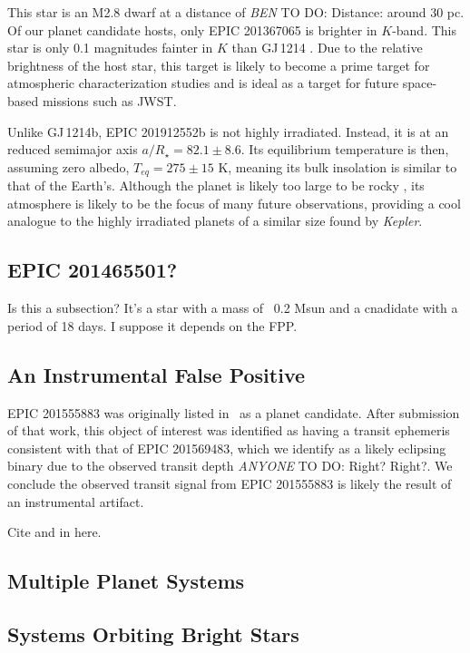 \documentclass{emulateapj}
\newcommand{\ars}{{$a/R_{\star}$}}
\newcommand{\project}[1]{\textsl{#1}}
\newcommand{\kep}{\project{Kepler}}
\newcommand{\paperit}{\citet{Foreman-Mackey15}}
\newcommand{\todo}[3]{{\color{#2} \emph{#1} TO DO: #3}}
\newcommand{\btmtodo}[1]{\todo{BEN}{red}{#1}}
\newcommand{\anytodo}[1]{\todo{ANYONE}{NavyBlue}{#1}}
\begin{document}
This star is an M2.8 dwarf at a distance of \btmtodo{Distance: around 30 pc}.
Of our planet candidate hosts, only EPIC 201367065 \citep[originally
discovered by][]{Crossfield15} is brighter in $K$-band.
This star is only 0.1 magnitudes fainter in $K$ than GJ\,1214 
\citep{Charbonneau09}.
Due to the relative brightness of the host star, this target is likely
to become a prime target for atmospheric characterization studies
and is ideal as a target for future space-based missions such as JWST.

Unlike GJ\,1214b, EPIC 201912552b is not highly irradiated. 
Instead, it is at an reduced semimajor axis \ars$ = 82.1 \pm 8.6$.
Its equilibrium temperature is then, assuming zero albedo, $T_{eq} = 275 \pm 15$
K, meaning its bulk insolation is similar to that of the Earth's.
Although the planet is likely too large to be rocky \citep{Rogers14}, 
its atmosphere is likely to be the focus of many future observations, providing
a cool analogue to the highly irradiated planets of a similar size found by 
\kep.



\subsection{EPIC 201465501?}
Is this a subsection? It's a star with a mass of ~0.2 Msun and a cnadidate with
a period of 18 days. I suppose it depends on the FPP.

\subsection{An Instrumental False Positive}

EPIC 201555883 was originally listed in \paperit\ as a planet candidate.
After submission of that work, this object of interest was identified as 
having a transit ephemeris consistent with that of EPIC 201569483, 
which we identify as a likely eclipsing binary due to the observed transit
depth \anytodo{Right? Right?}. 
We conclude the observed transit signal from EPIC 201555883 is likely the result 
of an instrumental artifact.

Cite \citet{Coughlin14} and \citet{Batalha13} in here.

\subsection{Multiple Planet Systems}


\subsection{Systems Orbiting Bright Stars}
\end{document}
